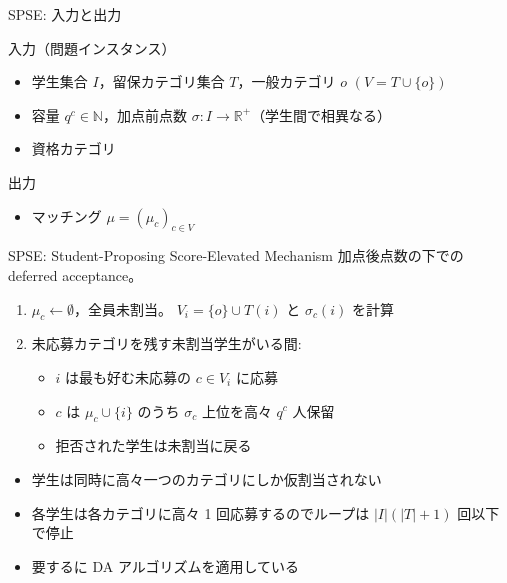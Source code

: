 \documentclass[aspectratio=43,11pt]{beamer}
\newcommand{\muc}[1]{\mu_{#1}}
\newcommand{\score}{\sigma}
\begin{document}
\begin{frame}{SPSE: 入力と出力}
  \begin{block}{入力（問題インスタンス）}
    \begin{itemize}
      \item 学生集合 $I$，留保カテゴリ集合 $T$，一般カテゴリ $o$
        $\left(V = T \cup \{o\}\right)$
      \item 容量 $q^c \in \mathbb{N}$，加点前点数
        $\score : I \to \mathbb{R}^{+}$（学生間で相異なる）
      \item 資格カテゴリ
    \end{itemize}
  \end{block}

  \begin{block}{出力}
    \begin{itemize}
      \item マッチング $\mu = (\muc{c})_{c \in V}$
    \end{itemize}
  \end{block}
\end{frame}

\begin{frame}{SPSE: Student-Proposing Score-Elevated Mechanism}
  加点後点数の下での deferred acceptance。
  \begin{enumerate}
    \item $\muc{c} \leftarrow \emptyset$，全員未割当。
      $V_i = \{o\} \cup T(i)$ と $\score_c(i)$ を計算
    \item 未応募カテゴリを残す未割当学生がいる間:
      \begin{itemize}
        \item $i$ は最も好む未応募の $c \in V_i$ に応募
        \item $c$ は $\muc{c} \cup \{i\}$ のうち $\score_c$ 上位を高々
          $q^c$ 人保留
        \item 拒否された学生は未割当に戻る
      \end{itemize}
  \end{enumerate}

  \begin{itemize}
    \item 学生は同時に高々一つのカテゴリにしか仮割当されない
    \item 各学生は各カテゴリに高々 1 回応募するのでループは
      $|I|(|T| + 1)$ 回以下で停止
    \item {\color{red}要するに DA アルゴリズムを適用している}
  \end{itemize}
\end{frame}
\end{document}
